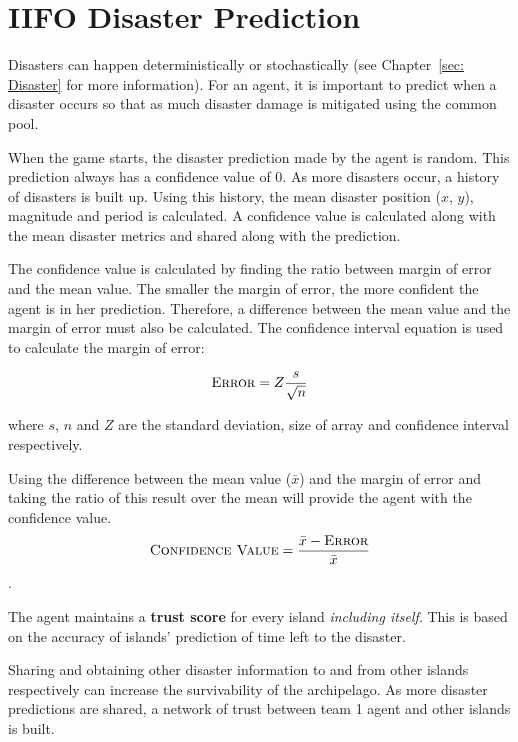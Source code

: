 \section{IIFO Disaster Prediction}
Disasters can happen deterministically or stochastically (see Chapter~\ref{sec: Disaster} for more information). For an agent, it is important to predict when a disaster occurs so that as much disaster damage is mitigated using the common pool.

When the game starts, the disaster prediction made by the agent is random. This prediction always has a confidence value of $0$. As more disasters occur, a history of disasters is built up. Using this history, the mean disaster position ($x$, $y$), magnitude and period is calculated. A confidence value is calculated along with the mean disaster metrics and shared along with the prediction.

The confidence value is calculated by finding the ratio between margin of error and the mean value. The smaller the margin of error, the more confident the agent is in her prediction. Therefore, a difference between the mean value and the margin of error must also be calculated. The confidence interval equation is used to calculate the margin of error:

\begin{equation}
    \label{eq: Team1MarginOfError}
    \textsc{Error} = Z \dfrac{s}{\sqrt{n}}
\end{equation}

where $s$, $n$ and $Z$ are the standard deviation, size of array and confidence interval respectively.

Using the difference between the mean value ($\bar{x}$) and the margin of error and taking the ratio of this result over the mean will provide the agent with the confidence value.
\begin{equation}
    \textsc{Confidence Value} = \frac{\bar{x} - \textsc{Error}}{\bar{x}}
\end{equation}.

The agent maintains a \textbf{trust score} for every island \emph{including itself}. This is based on the accuracy of islands' prediction of time left to the disaster.

Sharing and obtaining other disaster information to and from other islands respectively can increase the survivability of the archipelago. As more disaster predictions are shared, a network of trust between team 1 agent and other islands is built.

